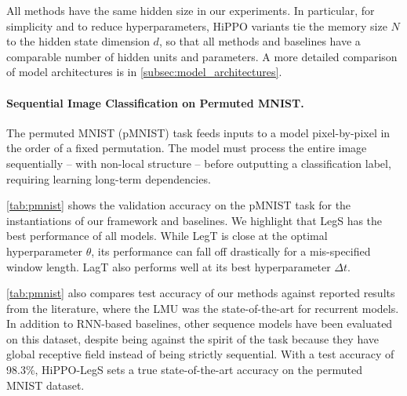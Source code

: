 \documentclass{article}
\begin{document}
All methods have the same hidden size in our experiments.
In particular, for simplicity and to reduce hyperparameters, HiPPO variants tie the memory size $N$ to the hidden state dimension $d$, so that all methods and baselines have a comparable number of hidden units and parameters.
A more detailed comparison of model architectures is in \cref{subsec:model_architectures}.



\paragraph{Sequential Image Classification on Permuted MNIST.}
The permuted MNIST (pMNIST) task feeds inputs to a model pixel-by-pixel in the order of a fixed permutation.
The model must process the entire image sequentially -- with non-local structure -- before
outputting a classification label, requiring learning long-term dependencies.

\cref{tab:pmnist} shows the validation accuracy on the pMNIST task for
the instantiations of our framework and baselines.
We highlight that LegS has the best performance of all models.
While LegT is close at the optimal hyperparameter $\theta$, its performance can fall off drastically for a mis-specified window length.
LagT also performs well at its best hyperparameter $\Delta t$.

\cref{tab:pmnist} also compares test accuracy of our methods against reported results from the literature, where the LMU was the state-of-the-art for recurrent models.
In addition to RNN-based baselines, other sequence models have been evaluated on this dataset, despite being against the spirit of the task
because they have global receptive field instead of being strictly sequential.
With a test accuracy of 98.3\%, HiPPO-LegS sets a true state-of-the-art accuracy on the permuted MNIST dataset.
\end{document}

